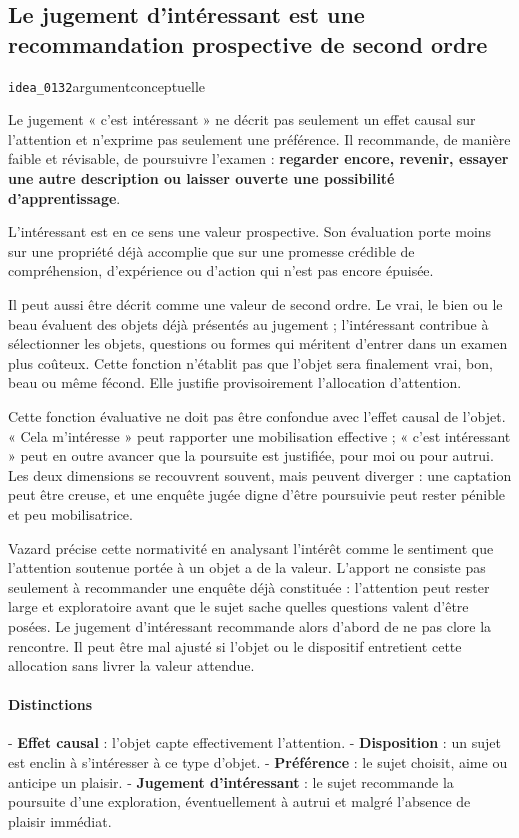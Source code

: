 \documentclass[10pt,a4paper]{article}
\begin{document}
\subsection{Le jugement d'intéressant est une recommandation prospective de second ordre}
{\small\color{metadata} \texttt{idea\_0132}\quad\textbullet\quad argument\quad\textbullet\quad conceptuelle\par}

Le jugement « c'est intéressant » ne décrit pas seulement un effet causal sur l'attention et n'exprime pas seulement une préférence. Il recommande, de manière faible et révisable, de poursuivre l'examen : \textbf{regarder encore, revenir, essayer une autre description ou laisser ouverte une possibilité d'apprentissage}.

L'intéressant est en ce sens une valeur prospective. Son évaluation porte moins sur une propriété déjà accomplie que sur une promesse crédible de compréhension, d'expérience ou d'action qui n'est pas encore épuisée.

Il peut aussi être décrit comme une valeur de second ordre. Le vrai, le bien ou le beau évaluent des objets déjà présentés au jugement ; l'intéressant contribue à sélectionner les objets, questions ou formes qui méritent d'entrer dans un examen plus coûteux. Cette fonction n'établit pas que l'objet sera finalement vrai, bon, beau ou même fécond. Elle justifie provisoirement l'allocation d'attention.

Cette fonction évaluative ne doit pas être confondue avec l'effet causal de l'objet. « Cela m'intéresse » peut rapporter une mobilisation effective ; « c'est intéressant » peut en outre avancer que la poursuite est justifiée, pour moi ou pour autrui. Les deux dimensions se recouvrent souvent, mais peuvent diverger : une captation peut être creuse, et une enquête jugée digne d'être poursuivie peut rester pénible et peu mobilisatrice.

Vazard précise cette normativité en analysant l'intérêt comme le sentiment que l'attention soutenue portée à un objet a de la valeur. L'apport ne consiste pas seulement à recommander une enquête déjà constituée : l'attention peut rester large et exploratoire avant que le sujet sache quelles questions valent d'être posées. Le jugement d'intéressant recommande alors d'abord de ne pas clore la rencontre. Il peut être mal ajusté si l'objet ou le dispositif entretient cette allocation sans livrer la valeur attendue.

\paragraph{Distinctions}
- \textbf{Effet causal} : l'objet capte effectivement l'attention. - \textbf{Disposition} : un sujet est enclin à s'intéresser à ce type d'objet. - \textbf{Préférence} : le sujet choisit, aime ou anticipe un plaisir. - \textbf{Jugement d'intéressant} : le sujet recommande la poursuite d'une exploration,   éventuellement à autrui et malgré l'absence de plaisir immédiat.
\end{document}
